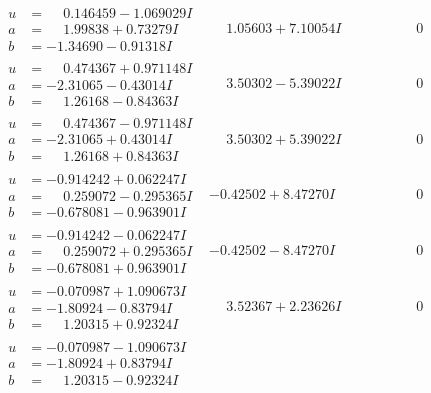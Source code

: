 \documentclass[1p]{elsarticle_modified}
\theoremstyle{definition}
\begin{document}
$$\begin{array}{c|c|c}
\begin{aligned}
u &= \phantom{-}0.146459 - 1.069029 I \\
a &= \phantom{-}1.99838 + 0.73279 I \\
b &= -1.34690 - 0.91318 I\end{aligned}
 & \phantom{-}1.05603 + 7.10054 I & \phantom{-0.000000 } 0 \\ \hline\begin{aligned}
u &= \phantom{-}0.474367 + 0.971148 I \\
a &= -2.31065 - 0.43014 I \\
b &= \phantom{-}1.26168 - 0.84363 I\end{aligned}
 & \phantom{-}3.50302 - 5.39022 I & \phantom{-0.000000 } 0 \\ \hline\begin{aligned}
u &= \phantom{-}0.474367 - 0.971148 I \\
a &= -2.31065 + 0.43014 I \\
b &= \phantom{-}1.26168 + 0.84363 I\end{aligned}
 & \phantom{-}3.50302 + 5.39022 I & \phantom{-0.000000 } 0 \\ \hline\begin{aligned}
u &= -0.914242 + 0.062247 I \\
a &= \phantom{-}0.259072 - 0.295365 I \\
b &= -0.678081 - 0.963901 I\end{aligned}
 & -0.42502 + 8.47270 I & \phantom{-0.000000 } 0 \\ \hline\begin{aligned}
u &= -0.914242 - 0.062247 I \\
a &= \phantom{-}0.259072 + 0.295365 I \\
b &= -0.678081 + 0.963901 I\end{aligned}
 & -0.42502 - 8.47270 I & \phantom{-0.000000 } 0 \\ \hline\begin{aligned}
u &= -0.070987 + 1.090673 I \\
a &= -1.80924 - 0.83794 I \\
b &= \phantom{-}1.20315 + 0.92324 I\end{aligned}
 & \phantom{-}3.52367 + 2.23626 I & \phantom{-0.000000 } 0 \\ \hline\begin{aligned}
u &= -0.070987 - 1.090673 I \\
a &= -1.80924 + 0.83794 I \\
b &= \phantom{-}1.20315 - 0.92324 I\end{aligned}

\end{array}$$
\end{document}
